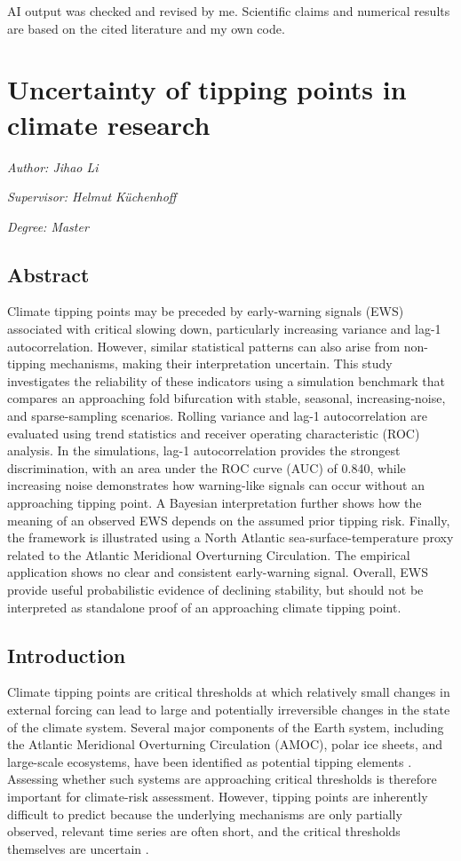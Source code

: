 \documentclass[
]{krantz}
\begin{document}
AI output was checked and revised by me. Scientific claims and numerical
results are based on the cited literature and my own code.

\chapter{Uncertainty of tipping points in climate research}\label{utp}

\emph{Author: Jihao Li}

\emph{Supervisor: Helmut Küchenhoff}

\emph{Degree: Master}

\section{Abstract}\label{abstract-6}

Climate tipping points may be preceded by early-warning signals (EWS) associated with critical slowing down, particularly increasing variance and lag-1 autocorrelation. However, similar statistical patterns can also arise from non-tipping mechanisms, making their interpretation uncertain. This study investigates the reliability of these indicators using a simulation benchmark that compares an approaching fold bifurcation with stable, seasonal, increasing-noise, and sparse-sampling scenarios. Rolling variance and lag-1 autocorrelation are evaluated using trend statistics and receiver operating characteristic (ROC) analysis. In the simulations, lag-1 autocorrelation provides the strongest discrimination, with an area under the ROC curve (AUC) of 0.840, while increasing noise demonstrates how warning-like signals can occur without an approaching tipping point. A Bayesian interpretation further shows how the meaning of an observed EWS depends on the assumed prior tipping risk. Finally, the framework is illustrated using a North Atlantic sea-surface-temperature proxy related to the Atlantic Meridional Overturning Circulation. The empirical application shows no clear and consistent early-warning signal. Overall, EWS provide useful probabilistic evidence of declining stability, but should not be interpreted as standalone proof of an approaching climate tipping point.

\section{Introduction}\label{introduction-8}

Climate tipping points are critical thresholds at which relatively small changes in external forcing can lead to large and potentially irreversible changes in the state of the climate system. Several major components of the Earth system, including the Atlantic Meridional Overturning Circulation (AMOC), polar ice sheets, and large-scale ecosystems, have been identified as potential tipping elements \citep{lenton2008}. Assessing whether such systems are approaching critical thresholds is therefore important for climate-risk assessment. However, tipping points are inherently difficult to predict because the underlying mechanisms are only partially observed, relevant time series are often short, and the critical thresholds themselves are uncertain \citep{mckay2022}.
\end{document}
